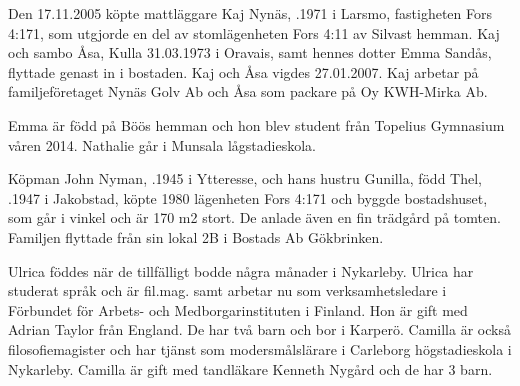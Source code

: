 %
Den 17.11.2005 köpte mattläggare Kaj Nynäs, .1971 i Larsmo, fastigheten Fors 4:171, som utgjorde en del av stomlägenheten Fors 4:11 av Silvast hemman.  Kaj och sambo Åsa, \textborn Kulla 31.03.1973 i Oravais, samt hennes dotter Emma Sandås, flyttade genast in i bostaden. Kaj och Åsa vigdes 27.01.2007. Kaj arbetar på familjeföretaget Nynäs Golv Ab och Åsa som packare på Oy KWH-Mirka Ab.
\begin{jhchildren}
  \item {}
  \item {}
  \item {}
\end{jhchildren}

Emma är född på Böös hemman och hon blev student från Topelius Gymnasium våren 2014. Nathalie går i Munsala lågstadieskola.


%
Köpman John Nyman, .1945 i Ytteresse, och hans hustru Gunilla, född Thel, .1947 i Jakobstad, köpte 1980 lägenheten Fors 4:171 och byggde bostadshuset, som går i vinkel och är 170 m2 stort. De anlade även en fin trädgård på tomten. Familjen flyttade från sin lokal 2B i Bostads Ab Gökbrinken.
\begin{jhchildren}
  \item {}
  \item {}
\end{jhchildren}
Ulrica föddes när de tillfälligt bodde några månader i Nykarleby. Ulrica har studerat språk och är fil.mag. samt arbetar nu som verksamhetsledare i Förbundet för Arbets- och Medborgarinstituten i Finland. Hon är gift med Adrian Taylor från England. De har två barn och bor i Karperö. Camilla är också filosofiemagister och har tjänst som modersmålslärare i Carleborg högstadieskola i Nykarleby. Camilla är gift med tandläkare Kenneth Nygård och de har 3 barn.

